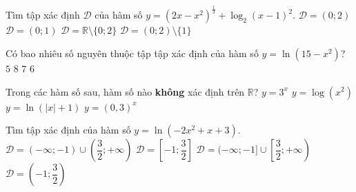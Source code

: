 \begin{ex}%
	Tìm tập xác định $\mathscr{D}$ của hàm  số $y=(2x-x^2)^{\frac{1}{3}}+\log_2(x-1)^2$.
	\choice 
		 {$\mathscr{D}=(0;2)$}
		 {$\mathscr{D}=(0;1)$}
		{$\mathscr{D}=\mathbb{R}\setminus \{0;2\}$} 
		{\True $\mathscr{D}=(0;2)\setminus \{1\}$} 
\end{ex}

\begin{ex}%
	Có bao nhiêu số nguyên thuộc tập tập xác định của  hàm số $y=\ln\left(15-x^2\right)$?
	 \choice
		{$5$} 
		{$8$} 
		 {\True $7$}
		{$6$} 
\end{ex}

\begin{ex}%
	Trong các hàm số sau, hàm số nào \textbf{không} xác  định trên $\mathbb{R}$?
	 \choice
		 {$y=3^x$}
		 {\True $y=\log(x^2)$}
		 {$y=\ln\left(|x|+1\right)$}
		{$y=\left(0{,}3\right)^x$} 
\end{ex}

\begin{ex}%
	Tìm tập xác định của hàm số $y=\ln  \left(-2x^2+x+3\right)$.
	\choice 
		 {$\mathscr{D}=(-\infty;-1) \cup\left(\dfrac{3}{2};+\infty\right)$}
		 {$\mathscr{D}=\left[-1; \dfrac{3}{2}\right]$}
		 {$\mathscr{D}=(-\infty;-1] \cup\left[\dfrac{3}{2};+\infty\right)$}
		{\True $\mathscr{D}=\left(-1; \dfrac{3}{2}\right)$} 
\end{ex}

